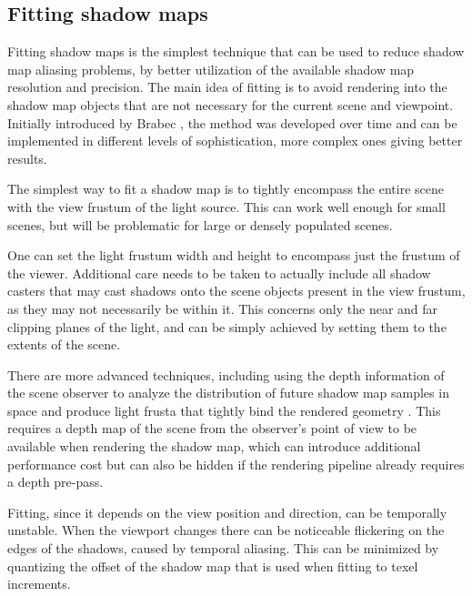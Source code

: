 \subsection{Fitting shadow maps}
Fitting shadow maps is the simplest technique that can be used to reduce shadow map aliasing problems, by better utilization of the available shadow map resolution and precision. The main idea of fitting is to avoid rendering into the shadow map objects that are not necessary for the current scene and viewpoint. Initially introduced by Brabec \cite{bib:article:brabec_linear_depth}, the method was developed over time and can be implemented in different levels of sophistication, more complex ones giving better results.

The simplest way to fit a shadow map is to tightly encompass the entire scene with the view frustum of the light source. This can work well enough for small scenes, but will be problematic for large or densely populated scenes.

One can set the light frustum width and height to encompass just the frustum of the viewer. Additional care needs to be taken to actually include all shadow casters that may cast shadows onto the scene objects present in the view frustum, as they may not necessarily be within it. This concerns only the near and far clipping planes of the light, and can be simply achieved by setting them to the extents of the scene.

There are more advanced techniques, including using the depth information of the scene observer to analyze the distribution of future shadow map samples in space and produce light frusta that tightly bind the rendered geometry \cite{bib:proc:luritzen_sample_dist_shadow_maps}. This requires a depth map of the scene from the observer's point of view to be available when rendering the shadow map, which can introduce additional performance cost but can also be hidden if the rendering pipeline already requires a depth pre-pass.

Fitting, since it depends on the view position and direction, can be temporally unstable. When the viewport changes there can be noticeable flickering on the edges of the shadows, caused by temporal aliasing. This can be minimized by quantizing the offset of the shadow map that is used when fitting to texel increments.

